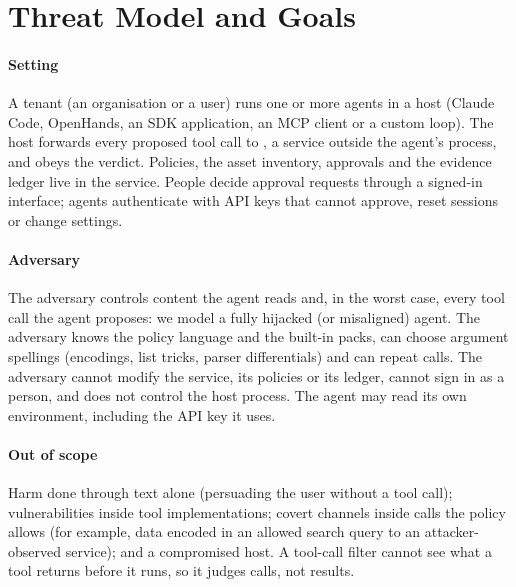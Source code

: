 \section{Threat Model and Goals}
\label{sec:threat}

\paragraph{Setting}
A tenant (an organisation or a user) runs one or more agents in a host (Claude Code, OpenHands, an SDK application, an MCP client or a custom loop). The host forwards every proposed tool call to \SystemName{}, a service outside the agent's process, and obeys the verdict. Policies, the asset inventory, approvals and the evidence ledger live in the service. People decide approval requests through a signed-in interface; agents authenticate with API keys that cannot approve, reset sessions or change settings.

\paragraph{Adversary}
The adversary controls content the agent reads and, in the worst case, every tool call the agent proposes: we model a fully hijacked (or misaligned) agent. The adversary knows the policy language and the built-in packs, can choose argument spellings (encodings, list tricks, parser differentials) and can repeat calls. The adversary cannot modify the service, its policies or its ledger, cannot sign in as a person, and does not control the host process. The agent may read its own environment, including the API key it uses.

\paragraph{Out of scope}
Harm done through text alone (persuading the user without a tool call); vulnerabilities inside tool implementations; covert channels inside calls the policy allows (for example, data encoded in an allowed search query to an attacker-observed service); and a compromised host. A tool-call filter cannot see what a tool returns before it runs, so it judges calls, not results.


